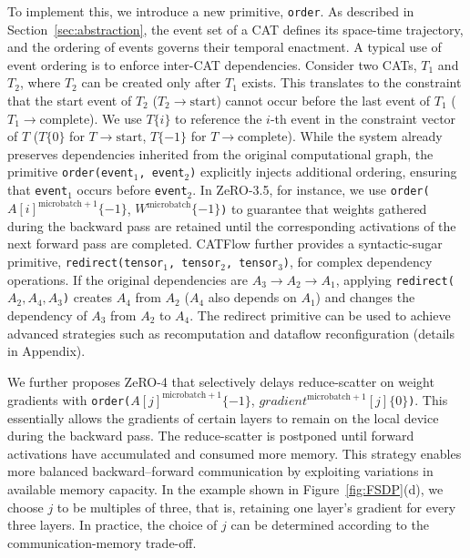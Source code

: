 \documentclass[letterpaper,twocolumn,10pt]{article}
\begin{document}
To implement this, we introduce a new primitive, \texttt{order}. As described in Section~\ref{sec:abstraction}, the event set of a CAT defines its space-time trajectory, and the ordering of events governs their temporal enactment. A typical use of event ordering is to enforce inter-CAT dependencies. Consider two CATs, $T_1$ and $T_2$, where $T_2$ can be created only after $T_1$ exists. This translates to the constraint that the start event of $T_2$ ($T_2\rightarrow\mathrm{start}$) cannot occur before the last event of $T_1$ ($T_1\rightarrow\mathrm{complete}$). We use $T\{i\}$ to reference the $i$-th event in the constraint vector of $T$ ($T\{0\}$ for $T\rightarrow\mathrm{start}$, $T\{-1\}$ for $T\rightarrow\mathrm{complete}$). While the system already preserves dependencies inherited from the original computational graph, the primitive \texttt{order(event$_1$, event$_2$)} explicitly injects additional ordering, ensuring that \texttt{event$_1$} occurs before \texttt{event$_2$}. In ZeRO-3.5, for instance, we use \texttt{order(}$A[i]^{\mathrm{microbatch}+1}\{-1\}$, $W^\mathrm{microbatch}\{-1\}$\texttt{)} to guarantee that weights gathered during the backward pass are retained until the corresponding activations of the next forward pass are completed. CATFlow further provides a syntactic-sugar primitive, \texttt{redirect(tensor$_1$, tensor$_2$, tensor$_3$)}, for complex dependency operations. If the original dependencies are $A_3 \to A_2 \to A_1$, applying \texttt{redirect(}$A_2, A_4, A_3$\texttt{)} creates $A_4$ from $A_2$ ($A_4$ also depends on $A_1$) and changes the dependency of $A_3$ from $A_2$ to $A_4$. The redirect primitive can be used to achieve advanced strategies such as recomputation and dataflow reconfiguration (details in Appendix).

We further proposes ZeRO-4 that selectively delays reduce-scatter on weight gradients with \texttt{order($A[j]^{\mathrm{microbatch}+1}\{-1\}$}, $gradient^{\mathrm{microbatch}+1}[j]\{0\}$\texttt{)}. This essentially allows the gradients of certain layers to remain on the local device during the backward pass. The reduce-scatter is postponed until forward activations have accumulated and consumed more memory. This strategy enables more balanced backward–forward communication by exploiting variations in available memory capacity. In the example shown in Figure~\ref{fig:FSDP}(d), we choose $j$ to be multiples of three, that is, retaining one layer's gradient for every three layers. In practice, the choice of $j$ can be determined according to the communication-memory trade-off.
\end{document}
